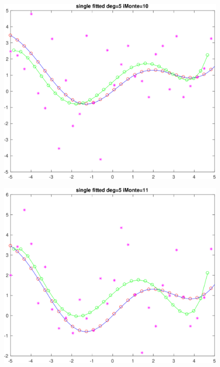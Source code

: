 \documentclass[11pt]{article}
\begin{document}
\begin{figure}[h!]
\centering\includegraphics[scale=0.1]{single_poly_d_5_iMonte_10.png}
\end{figure}


\begin{figure}[h!]
\centering\includegraphics[scale=0.1]{single_poly_d_5_iMonte_11.png}
\end{figure}
\end{document}
